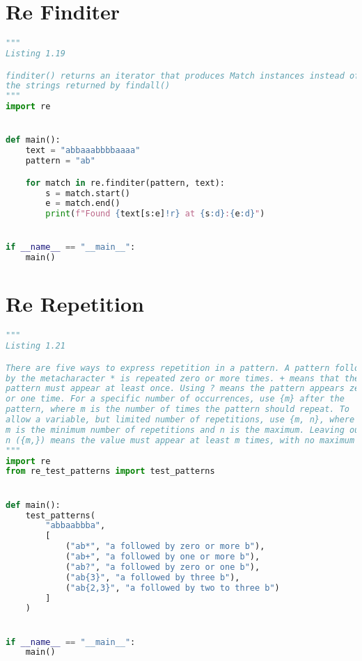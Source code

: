 \documentclass[a4paper,landscape]{report}
\begin{document}
\section{Re Finditer}
\begin{lstlisting}[language=Python]
"""
Listing 1.19

finditer() returns an iterator that produces Match instances instead of
the strings returned by findall()
"""
import re


def main():
    text = "abbaaabbbbaaaa"
    pattern = "ab"

    for match in re.finditer(pattern, text):
        s = match.start()
        e = match.end()
        print(f"Found {text[s:e]!r} at {s:d}:{e:d}")


if __name__ == "__main__":
    main()

\end{lstlisting}
\section{Re Repetition}
\begin{lstlisting}[language=Python]
"""
Listing 1.21

There are five ways to express repetition in a pattern. A pattern followed
by the metacharacter * is repeated zero or more times. + means that the
pattern must appear at least once. Using ? means the pattern appears zero
or one time. For a specific number of occurrences, use {m} after the
pattern, where m is the number of times the pattern should repeat. To
allow a variable, but limited number of repetitions, use {m, n}, where
m is the minimum number of repetitions and n is the maximum. Leaving out
n ({m,}) means the value must appear at least m times, with no maximum
"""
import re
from re_test_patterns import test_patterns


def main():
    test_patterns(
        "abbaabbba",
        [
            ("ab*", "a followed by zero or more b"),
            ("ab+", "a followed by one or more b"),
            ("ab?", "a followed by zero or one b"),
            ("ab{3}", "a followed by three b"),
            ("ab{2,3}", "a followed by two to three b")
        ]
    )


if __name__ == "__main__":
    main()

\end{lstlisting}
\end{document}
